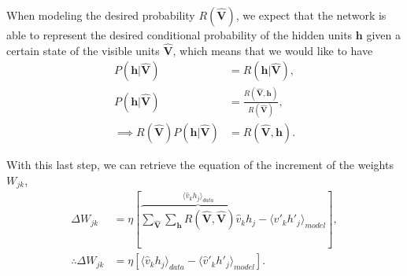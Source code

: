 When modeling the desired probability $R(\mathbf{\hat{V}})$, we expect that the network is able to represent the desired conditional probability of the hidden units $\mathbf{h}$ given a certain state of the visible units $\mathbf{\hat{V}}$, which means that we would like to have
\begin{align}
    \label{eq:app:rsm-desired-conditional-hidden}
    P(\mathbf{h}|\mathbf{\hat{V}}) &= R(\mathbf{h}|\mathbf{\hat{V}}), \\ %
    P(\mathbf{h}|\mathbf{\hat{V}}) &= \frac{R(\mathbf{\hat{V}}, \mathbf{h})}{R(\mathbf{\hat{V}})}, \nonumber \\ %
    \label{eq:app:rsm-wjk-likelihood}
    \implies R(\mathbf{\hat{V}}) P(\mathbf{h}|\mathbf{\hat{V}}) &= R(\mathbf{\hat{V}}, \mathbf{h}). 
\end{align}

With this last step, we can retrieve the equation of the increment of the weights $W_{jk}$,
\begin{align}
    \Delta W_{jk} &= \eta \left[ \overbrace{\sum_{\mathbf{\hat{V}}} \sum_{\mathbf{h}} R(\mathbf{\hat{V}}, \mathbf{\hat{V}}) \hat{v}_{k} h_{j}}^{\langle \hat{v}_{k} h_{j} \rangle_{data}} - \langle \hat{v}'_{k} h'_{j} \rangle_{model} \right], \nonumber \\ %
    \therefore \Delta W_{jk} &= \eta \left[ \langle \hat{v}_{k} h_{j} \rangle_{data} - \langle \hat{v}'_{k} h'_{j} \rangle_{model} \right].
\end{align}





 

